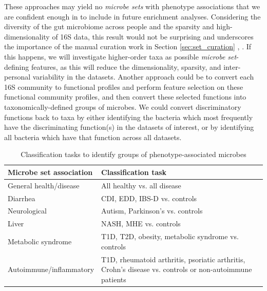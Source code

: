 \documentclass[12pt]{article}
\begin{document}
These approaches may yield no \textit{microbe sets} with phenotype associations
that we are confident enough in to include in future enrichment analyses.
Considering the diversity of the gut microbiome across people and the
sparsity and high-dimensionality of 16S data, 
this result would not be surprising and underscores the importance of the
manual curation work in Section \ref{sec:set_curation} \cite{wang-pval_method-2016}, \cite{knights-biomarkers-2011}.
If this happens, we will investigate higher-order taxa as possible \textit{microbe set}-defining features,
as this will reduce the dimensionality, sparsity, and inter-personal 
variability in the datasets.
Another approach could be to convert each 16S community to functional profiles \cite{langille-picrust-2013}
and perform feature selection on these functional community profiles, and then
convert these selected functions into taxonomically-defined groups of microbes. 
We could convert discriminatory functions back to taxa
by either identifying the bacteria which most frequently have
the discriminating function(s) in the datasets of interest, or by identifying all bacteria which have that function across all datasets.
{
\renewcommand{\arraystretch}{1.2}
\begin{table}
\begin{center}
\begin{tabular}{ m{6cm} m{10cm} }
	\hline
	\textbf{Microbe set association} & \textbf{Classification task} \\
	\hline
	General health/disease & All healthy vs. all disease \\
	Diarrhea & CDI, EDD, IBS-D vs. controls \\
	Neurological & Autism, Parkinson's vs. controls \\
	Liver & NASH, MHE vs. controls\\
	Metabolic syndrome & T1D, T2D, obesity, metabolic syndrome vs. 
	controls \\
	Autoimmune/inflammatory & T1D, rheumatoid arthritis, psoriatic arthritis, Crohn's disease 
	vs. controls or non-autoimmune patients \\
	\hline
\end{tabular}
\caption{Classification tasks to identify groups of phenotype-associated microbes}\label{tab:classifications}
\end{center}
\end{table}
}
\end{document}
